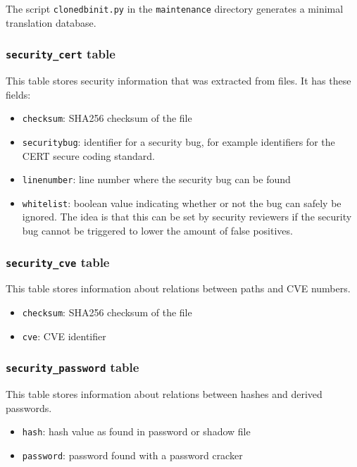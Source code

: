 \documentclass[10pt,a4paper]{article}
\begin{document}
The script \texttt{clonedbinit.py} in the \texttt{maintenance} directory
generates a minimal translation database.

\subsubsection{\texttt{security\_cert} table}

This table stores security information that was extracted from files. It has
these fields:

\begin{itemize}
\item \texttt{checksum}: SHA256 checksum of the file
\item \texttt{securitybug}: identifier for a security bug, for example
identifiers for the CERT secure coding standard.
\item \texttt{linenumber}: line number where the security bug can be found
\item \texttt{whitelist}: boolean value indicating whether or not the bug can
safely be ignored. The idea is that this can be set by security reviewers if
the security bug cannot be triggered to lower the amount of false positives.
\end{itemize}

\subsubsection{\texttt{security\_cve} table}

This table stores information about relations between paths and CVE numbers.

\begin{itemize}
\item \texttt{checksum}: SHA256 checksum of the file
\item \texttt{cve}: CVE identifier
\end{itemize}

\subsubsection{\texttt{security\_password} table}

This table stores information about relations between hashes and derived passwords.

\begin{itemize}
\item \texttt{hash}: hash value as found in password or shadow file
\item \texttt{password}: password found with a password cracker
\end{itemize}
\end{document}
